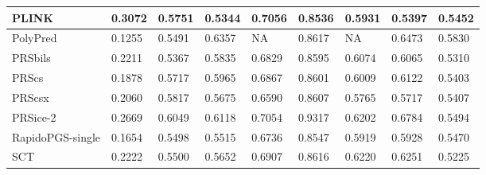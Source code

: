 \documentclass[pdflatex,sn-basic]{sn-jnl}
\begin{document}
\begin{table}[!ht]
{\begin{tabular}{|l|l|l|l|l|l|l|l|l|}
\hline
PLINK \cite{Purcell_2007} & \cellcolor[HTML]{94CD7E}0.3072 & \cellcolor[HTML]{FEE582}0.5751 & \cellcolor[HTML]{FA9A74}0.5344 & \cellcolor[HTML]{FEE783}0.7056 & \cellcolor[HTML]{FEE883}0.8536 & \cellcolor[HTML]{FED980}0.5931 & \cellcolor[HTML]{F8746D}0.5397 & \cellcolor[HTML]{FDEB84}0.5452 \\
\hline
PolyPred \cite{Hu_2017} & \cellcolor[HTML]{FCBA7A}0.1255 & \cellcolor[HTML]{FCC37C}0.5491 & \cellcolor[HTML]{98CE7F}0.6357 & NA& \cellcolor[HTML]{FCEA84}0.8617 & NA& \cellcolor[HTML]{A5D17F}0.6473 & \cellcolor[HTML]{B8D780}0.5830 \\
\hline
PRSbils & \cellcolor[HTML]{F0E784}0.2211 & \cellcolor[HTML]{FCB379}0.5367 & \cellcolor[HTML]{FAEA84}0.5835 & \cellcolor[HTML]{FCBF7B}0.6829 & \cellcolor[HTML]{FEEA83}0.8595 & \cellcolor[HTML]{F1E784}0.6074 & \cellcolor[HTML]{FAEA84}0.6065 & \cellcolor[HTML]{FA9E75}0.5310 \\
\hline
PRScs \cite{Ge_2019} & \cellcolor[HTML]{FEDF81}0.1878 & \cellcolor[HTML]{FEE182}0.5717 & \cellcolor[HTML]{E1E383}0.5965 & \cellcolor[HTML]{FDC67C}0.6867 & \cellcolor[HTML]{FFEB84}0.8601 & \cellcolor[HTML]{FFEB84}0.6009 & \cellcolor[HTML]{EEE683}0.6122 & \cellcolor[HTML]{FDD57F}0.5403 \\
\hline
PRScsx \cite{Ruan_2022} & \cellcolor[HTML]{FEEA83}0.2060 & \cellcolor[HTML]{F8E984}0.5817 & \cellcolor[HTML]{FDD47F}0.5675 & \cellcolor[HTML]{FA9573}0.6590 & \cellcolor[HTML]{FEEB84}0.8607 & \cellcolor[HTML]{FCB479}0.5765 & \cellcolor[HTML]{FBAF78}0.5717 & \cellcolor[HTML]{FDD780}0.5407 \\
\hline
PRSice-2 \cite{Choi_2019} & \cellcolor[HTML]{BFD981}0.2669 & \cellcolor[HTML]{B0D580}0.6049 & \cellcolor[HTML]{C5DB81}0.6118 & \cellcolor[HTML]{FEE783}0.7054 & \cellcolor[HTML]{63BE7B}0.9317 & \cellcolor[HTML]{D5DF82}0.6202 & \cellcolor[HTML]{63BE7B}0.6784 & \cellcolor[HTML]{F6E984}0.5494 \\
\hline
RapidoPGS-single \cite{Reales_2021} & \cellcolor[HTML]{FDD27F}0.1654 & \cellcolor[HTML]{FCC47C}0.5498 & \cellcolor[HTML]{FCB87A}0.5515 & \cellcolor[HTML]{FBAF78}0.6736 & \cellcolor[HTML]{FEE983}0.8547 & \cellcolor[HTML]{FDD780}0.5919 & \cellcolor[HTML]{FDD680}0.5928 & \cellcolor[HTML]{FAEA84}0.5470 \\
\hline
SCT \cite{Priv__2019} & \cellcolor[HTML]{EFE784}0.2222 & \cellcolor[HTML]{FCC47C}0.5500 & \cellcolor[HTML]{FDD07E}0.5652 & \cellcolor[HTML]{FDCD7E}0.6907 & \cellcolor[HTML]{FCEB84}0.8616 & \cellcolor[HTML]{D1DE82}0.6220 & \cellcolor[HTML]{D3DF82}0.6251 & \cellcolor[HTML]{F86C6B}0.5225 \\

\end{tabular}}
\end{table}
\end{document}
